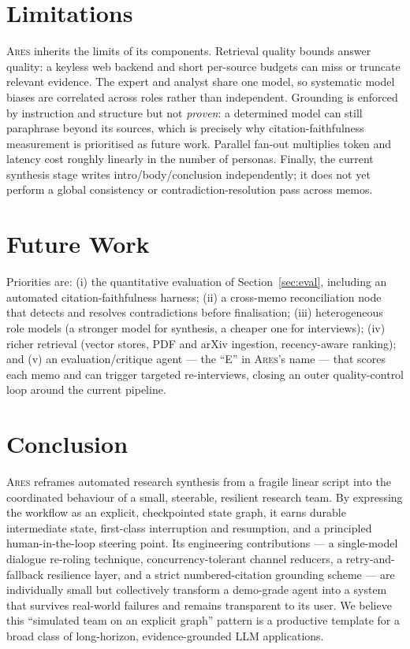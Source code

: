 \documentclass[10pt,twocolumn]{article}
\newcommand{\ares}{\textsc{Ares}}
\begin{document}
\section{Limitations}
\label{sec:limits}

\ares{} inherits the limits of its components. Retrieval quality bounds answer
quality: a keyless web backend and short per-source budgets can miss or truncate
relevant evidence. The expert and analyst share one model, so systematic model
biases are correlated across roles rather than independent. Grounding is enforced
by instruction and structure but not \emph{proven}: a determined model can still
paraphrase beyond its sources, which is precisely why citation-faithfulness
measurement is prioritised as future work. Parallel fan-out multiplies token and
latency cost roughly linearly in the number of personas. Finally, the current
synthesis stage writes intro/body/conclusion independently; it does not yet
perform a global consistency or contradiction-resolution pass across memos.

\section{Future Work}
\label{sec:future}

Priorities are: (i) the quantitative evaluation of Section~\ref{sec:eval},
including an automated citation-faithfulness harness; (ii) a cross-memo
reconciliation node that detects and resolves contradictions before finalisation;
(iii) heterogeneous role models (a stronger model for synthesis, a cheaper one
for interviews); (iv) richer retrieval (vector stores, PDF and arXiv ingestion,
recency-aware ranking); and (v) an evaluation/critique agent --- the ``E'' in
\ares{}'s name --- that scores each memo and can trigger targeted re-interviews,
closing an outer quality-control loop around the current pipeline.

\section{Conclusion}
\label{sec:conclusion}

\ares{} reframes automated research synthesis from a fragile linear script into
the coordinated behaviour of a small, steerable, resilient research team. By
expressing the workflow as an explicit, checkpointed state graph, it earns
durable intermediate state, first-class interruption and resumption, and a
principled human-in-the-loop steering point. Its engineering contributions --- a
single-model dialogue re-roling technique, concurrency-tolerant channel reducers,
a retry-and-fallback resilience layer, and a strict numbered-citation grounding
scheme --- are individually small but collectively transform a demo-grade agent
into a system that survives real-world failures and remains transparent to its
user. We believe this ``simulated team on an explicit graph'' pattern is a
productive template for a broad class of long-horizon, evidence-grounded
LLM applications.
\end{document}
